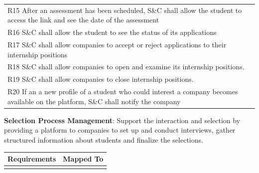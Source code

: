 \begin{enumerate}[label={[G\arabic*]}]
\begin{longtable}{|p{8cm}|p{8cm}|}
R15 After an assessment has been scheduled, S\&C shall allow the student to access the link and see the date of the assessment & \\
R16 S\&C shall allow the student to see the status of its applications & \\
R17 S\&C shall allow companies to accept or reject applications to their internship positions & \\
R18 S\&C shall allow companies to open and examine its internship positions. & \\
R19 S\&C shall allow companies to close internship positions. & \\
R20 If an a new profile of a student who could interest a company becomes available on the platform, S\&C shall notify the company & \\

\end{longtable}

\item \textbf{Selection Process Management}: 
                Support the interaction and selection by providing a platform to companies to set up and conduct interviews, gather structured information about students and finalize the selections.

\begin{longtable}{|p{8cm}|p{8cm}|}
\hline
\rowcolor[HTML]{CFE2F3} 
\textbf{Requirements} & \textbf{Mapped To} \\
\hline
\endfirsthead

\hline
\endfoot

\hline
\endlastfoot


\end{longtable}
\end{enumerate}

